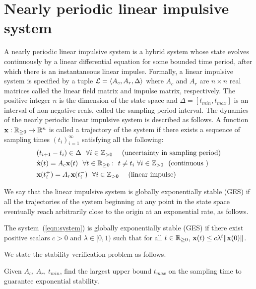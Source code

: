 \section{Nearly periodic linear impulsive system}\label{sec:lis}
A nearly periodic linear impulsive system is a hybrid system
whose state evolves continuously by a linear differential equation
for some bounded time period, after which there is an instantaneous
linear impulse.  Formally, a linear impulsive system is specified by
a tuple $\mathcal{L}=\left<A_c,A_r,\Delta\right>$ where $A_c$ and $A_r$ are
$n\times n$ real matrices called the linear field matrix and impulse
matrix, respectively.  The positive integer $n$ is the dimension of
the state space and $\Delta=[t_{min},t_{max}]$ is an interval of
non-negative reals, called the sampling period interval.  The
dynamics of the nearly periodic linear impulsive system is described
as follows.  A function
$\textbf{x}:\mathbb{R}_{\geq 0}\rightarrow \mathbb{R}^n$ is called a trajectory
of the system if there exists a sequence of sampling times
$(t_i)_{i=1}^\infty$ satisfying all the following:
%
	\begin{equation}\label{eqn:system} \begin{split}
&(t_{i+1}-t_i)\in\Delta~~\forall i\in\mathbb{Z}_{> 0}~~~~(\text{uncertainty in sampling period})\\
&\dot{\textbf{x}}(t)=A_c\textbf{x}(t)~~\forall
            t\in\mathbb{R}_{\geq 0}:~t\neq t_i ~\forall i\in\mathbb{Z}_{> 0}~~(\text{continuous
              })\\
&\textbf{x}(t_i^+)=A_r\textbf{x}(t_i^-)~~\forall
            i\in\mathbb{Z}_{> 0}~~~~(\text{linear impulse})           
\end{split} \end{equation}
%

We say that the linear impulsive system is globally exponentially
stable (GES) if all the trajectories of the system beginning at any
point in the state space eventually reach arbitrarily close to the
origin at an exponential rate, as %
follows.
%
\begin{defn}
  The system~(\ref{eqn:system}) is
  globally exponentially stable (GES) if there exist positive scalars
  $c>0$ and $\lambda\in[0,1)$ such that for all $t\in\mathbb{R}_{\geq 0}$,
  $\textbf{x}(t)\leq c\lambda^t\|\textbf{x}(0)\|$.
\end{defn}
We state the stability verification problem as follows.
%
\begin{problem}
Given $A_c$, $A_r$, $t_{min}$, find the largest upper bound $t_{max}$ on the sampling time to guarantee exponential stability.
\end{problem}
%


